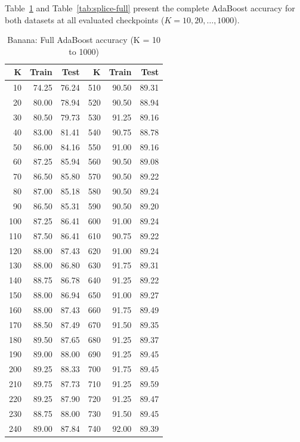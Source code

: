 \documentclass{acm_proc_article-sp}
\begin{document}
Table~\ref{tab:banana-full} and Table~\ref{tab:splice-full} present the complete AdaBoost accuracy for both datasets at all evaluated checkpoints ($K = 10, 20, \ldots, 1000$).

\begin{table}[H]
\centering
\caption{Banana: Full AdaBoost accuracy (K = 10 to 1000)}
\label{tab:banana-full}
{\footnotesize
\begin{tabular}{r r r | r r r}
\toprule
\textbf{K} & \textbf{Train} & \textbf{Test} & \textbf{K} & \textbf{Train} & \textbf{Test} \\
\midrule
10  & 74.25 & 76.24 & 510 & 90.50 & 89.31 \\
20  & 80.00 & 78.94 & 520 & 90.50 & 88.94 \\
30  & 80.50 & 79.73 & 530 & 91.25 & 89.16 \\
40  & 83.00 & 81.41 & 540 & 90.75 & 88.78 \\
50  & 86.00 & 84.16 & 550 & 91.00 & 89.16 \\
60  & 87.25 & 85.94 & 560 & 90.50 & 89.08 \\
70  & 86.50 & 85.80 & 570 & 90.50 & 89.22 \\
80  & 87.00 & 85.18 & 580 & 90.50 & 89.24 \\
90  & 86.50 & 85.31 & 590 & 90.50 & 89.20 \\
100 & 87.25 & 86.41 & 600 & 91.00 & 89.24 \\
110 & 87.50 & 86.41 & 610 & 90.75 & 89.22 \\
120 & 88.00 & 87.43 & 620 & 91.00 & 89.24 \\
130 & 88.00 & 86.80 & 630 & 91.75 & 89.31 \\
140 & 88.75 & 86.78 & 640 & 91.25 & 89.22 \\
150 & 88.00 & 86.94 & 650 & 91.00 & 89.27 \\
160 & 88.00 & 87.43 & 660 & 91.75 & 89.49 \\
170 & 88.50 & 87.49 & 670 & 91.50 & 89.35 \\
180 & 89.50 & 87.65 & 680 & 91.25 & 89.37 \\
190 & 89.00 & 88.00 & 690 & 91.25 & 89.45 \\
200 & 89.25 & 88.33 & 700 & 91.75 & 89.45 \\
210 & 89.75 & 87.73 & 710 & 91.25 & 89.59 \\
220 & 89.25 & 87.90 & 720 & 91.25 & 89.47 \\
230 & 88.75 & 88.00 & 730 & 91.50 & 89.45 \\
240 & 89.00 & 87.84 & 740 & 92.00 & 89.39 \\

\end{tabular}}
\end{table}
\end{document}
